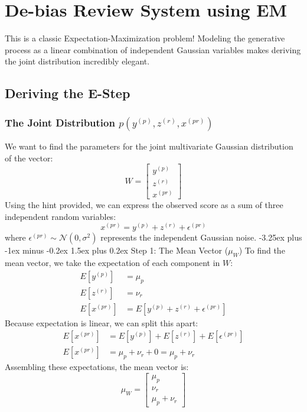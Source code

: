 \documentclass[twoside, 10pt]{article}
\makeatletter
\renewcommand{\paragraph}{\@startsection{paragraph}{4}{0pt}%
    {-3.25ex plus -1ex minus -0.2ex}%
    {1.5ex plus 0.2ex}%
    {\normalfont\normalsize\bfseries}}
\makeatother
\begin{document}
\section{De-bias Review System using EM}
This is a classic Expectation-Maximization problem! Modeling the generative process as a linear combination of independent Gaussian variables makes deriving the joint distribution incredibly elegant.
\subsection{Deriving the E-Step}
\subsubsection{The Joint Distribution $p(y^{(p)}, z^{(r)}, x^{(pr)})$}
We want to find the parameters for the joint multivariate Gaussian distribution of the vector:
\[
W = \begin{bmatrix} y^{(p)} \\ z^{(r)} \\ x^{(pr)} \end{bmatrix}
\]
Using the hint provided, we can express the observed score as a sum of three independent random variables:
\[
x^{(pr)} = y^{(p)} + z^{(r)} + \epsilon^{(pr)}
\]
where $\epsilon^{(pr)} \sim \mathcal{N}(0, \sigma^2)$ represents the independent Gaussian noise.
\paragraph{Step 1: The Mean Vector ($\mu_W$)}
To find the mean vector, we take the expectation of each component in $W$:
\begin{align*}
E[y^{(p)}] &= \mu_p \\
E[z^{(r)}] &= \nu_r \\
E[x^{(pr)}] &= E[y^{(p)} + z^{(r)} + \epsilon^{(pr)}]
\end{align*}
Because expectation is linear, we can split this apart:
\begin{align*}
E[x^{(pr)}] &= E[y^{(p)}] + E[z^{(r)}] + E[\epsilon^{(pr)}] \\
E[x^{(pr)}] &= \mu_p + \nu_r + 0 = \mu_p + \nu_r
\end{align*}
Assembling these expectations, the mean vector is:
\[
\mu_W = \begin{bmatrix} \mu_p \\ \nu_r \\ \mu_p + \nu_r \end{bmatrix}
\]
\end{document}
